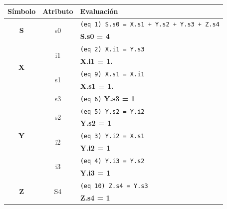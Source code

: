 \begin{center}\begin{tabular}{|| c | c | l ||}
\hline \hline

\rowcolor{gris} \textbf{Símbolo}&\textbf{Atributo}&\textbf{Evaluación}\\ \hline

\multirow{2}{*}{\textbf{S}} & \multirow{2}{*}{s0} & \texttt{(eq 1) S.s0 = X.s1 + Y.s2 + Y.s3 + Z.s4} \\ 
                           &                     & \textbf{S.s0 = 4} \\ \hline

\multirow{4}{*}{\textbf{X}} & \multirow{2}{*}{i1} & \texttt{(eq 2) X.i1 = Y.s3} \\ 
                           &                     & \textbf{X.i1 = 1.} \\ \cline{2-3}
                           & \multirow{2}{*}{s1} & \texttt{(eq 9) X.s1 = X.i1} \\ 
                           &                     & \textbf{X.s1 = 1.} \\ \hline

\multirow{7}{*}{\textbf{Y}} &                 s3  & \texttt{(eq 6)} \textbf{Y.s3 = 1} \\ \cline{2-3}
                           & \multirow{2}{*}{s2} &    \texttt{(eq 5) Y.s2 = Y.i2} \\
                           &                     & \textbf{Y.s2 = 1} \\ \cline{2-3}
                           & \multirow{2}{*}{i2} & \texttt{(eq 3) Y.i2 = X.s1} \\
                           &                     & \textbf{Y.i2 = 1} \\ \cline{2-3}
                           & \multirow{2}{*}{i3} & \texttt{(eq 4) Y.i3 = Y.s2} \\
                           &                     & \textbf{Y.i3 = 1} \\ \hline

\multirow{2}{*}{\textbf{Z}} & \multirow{2}{*}{S4} & \texttt{(eq 10) Z.s4 = Y.s3} \\
                           &                     & \textbf{Z.s4 = 1} \\ \hline


\end{tabular}
\end{center}
